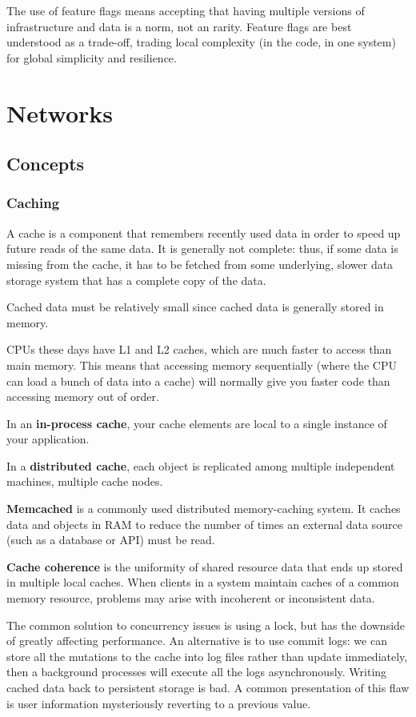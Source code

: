 \documentclass{article}
\begin{document}
    The use of feature flags means accepting that having multiple versions of infrastructure and data is a norm, not an rarity. Feature flags are best understood as a trade-off, trading local complexity (in the code, in one system) for global simplicity and resilience. 
    
\newpage
\section{Networks}
    \subsection{Concepts}
    
    \subsubsection{Caching}
    A cache is a component that remembers recently used data in order to speed up future reads of the same data. It is generally not complete: thus, if some data is missing from the cache, it has to be fetched from some underlying, slower data storage system that has a complete copy of the data.
    
    Cached data must be relatively small since cached data is generally stored in memory.
    
    CPUs these days have L1 and L2 caches, which are much faster to access than main memory. This means that accessing memory sequentially (where the CPU can load a bunch of data into a cache) will normally give you faster code than accessing memory out of order.
    
    In an \textbf{in-process cache}, your cache elements are local to a single instance of your application. 
    
    In a \textbf{distributed cache}, each object is replicated among multiple independent machines, multiple cache nodes.
    
    \textbf{Memcached} is a commonly used distributed memory-caching system. It caches data and objects in RAM to reduce the number of times an external data source (such as a database or API) must be read.
    
    \textbf{Cache coherence} is the uniformity of shared resource data that ends up stored in multiple local caches. When clients in a system maintain caches of a common memory resource, problems may arise with incoherent or inconsistent data.
    
    The common solution to concurrency issues is using a lock, but has the downside of greatly affecting performance. An alternative is to use commit logs: we can store all the mutations to the cache into log files rather than update immediately, then a background processes will execute all the logs asynchronously. Writing cached data back to persistent storage is bad. A common presentation of this flaw is user information mysteriously reverting to a previous value. 
    
\end{document}
